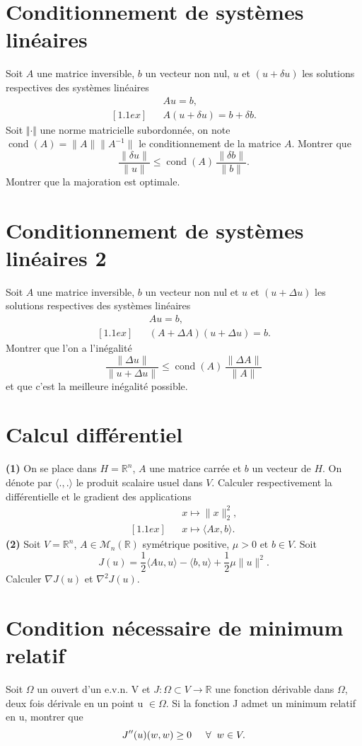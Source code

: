 \documentclass[11pt, a4paper]{article}
\newcommand{\mq}{montrer que }
\newcommand{\be}{\begin{equation}}
\newcommand{\ee}{\end{equation}}
\begin{document}
\section{Conditionnement de systèmes linéaires}
%
Soit $A$ une matrice inversible, $b$ un vecteur non nul, $u$ et $(u+\delta u)$ 
les solutions respectives des systèmes linéaires
\begin{eqnarray*}
&&A u = b, \\ [1.1ex]
&&A(u+\delta u) = b+\delta b.
\end{eqnarray*}
%
Soit $\Vert \cdot \Vert$ une norme matricielle subordonnée, on note $\mathop{cond}(A)=\|A\|\|A^{-1}\|$ le conditionnement de la matrice $A$. Montrer que
\[
\dfrac{\|\delta u\|}{\|u\|}\leq \mathop{cond}(A)\, \dfrac{\|\delta b\|}{\|b\|}.
\]
Montrer que la majoration est optimale.
%
\section{Conditionnement de systèmes linéaires 2}
%
Soit $A$ une matrice inversible, $b$ un vecteur non nul et $u$ et $(u+\Delta u)$ les solutions respectives des systèmes linéaires
%
\begin{eqnarray*}
&&Au = b, \\ [1.1ex]
&&(A+\Delta A)(u+\Delta u) = b. 
\end{eqnarray*}
%
Montrer que l'on a l'inégalité
\[
\dfrac{\|\Delta u\|}{\|u+\Delta u\|} \leq \mathop{cond}(A)\, \dfrac{\|\Delta A\|}{\|A\|}
\]
et que c'est la meilleure inégalité possible.
%
\medskip
\section{Calcul différentiel}
%
\textbf{(1)} On se place dans $H=\mathbb{R}^n$, $A$ une matrice carrée et $b$ un vecteur de $H$. On dénote par $\langle .,. \rangle$ le produit scalaire usuel dans $V$.
Calculer respectivement la différentielle et le gradient des applications
%
\begin{eqnarray*}
&& x\mapsto \|x\|_2^2, \\ [1.1ex]
&& x\mapsto \langle Ax,b \rangle.
\end{eqnarray*}
%
\textbf{(2)} Soit $V=\mathbb{R}^n$, $A\in\mathscr{M}_n(\mathbb{R})$ symétrique
positive, $\mu>0$ et $b\in V$. Soit 
\[
J(u) = \frac{1}{2}\langle A u,u\rangle - \langle b,u \rangle + \frac{1}{2}\mu \|u\|^2.
\]
Calculer $\nabla J(u)$ et $\nabla^2 J(u)$.
\section{Condition nécessaire de minimum relatif}
%
Soit $\Omega$ un ouvert d'un e.v.n. V et $J:\Omega \subset V \rightarrow \mathbb{R}$ une fonction dérivable dans $\Omega$, deux fois dérivale en un point u $\in \Omega$. Si la fonction J admet un minimum relatif en u, \mq
\be
J''(u)(w,w) \geq 0 \hspace{5mm} \forall \hspace{2mm}  w\in V.
\ee
\end{document}
